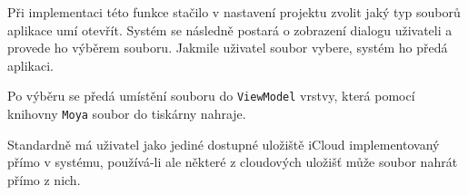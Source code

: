 Při implementaci této funkce stačilo v nastavení projektu zvolit jaký typ souborů aplikace umí otevřít.
Systém se následně postará o zobrazení dialogu uživateli a provede ho výběrem souboru.
Jakmile uživatel soubor vybere, systém ho předá aplikaci.


\bigskip{}

Po výběru se předá umístění souboru do \texttt{ViewModel} vrstvy, která pomocí knihovny \texttt{Moya} soubor do tiskárny nahraje.

Standardně má uživatel jako jediné dostupné uložiště iCloud implementovaný přímo v systému, používá-li ale některé z cloudových uložišť může soubor nahrát přímo z nich.
